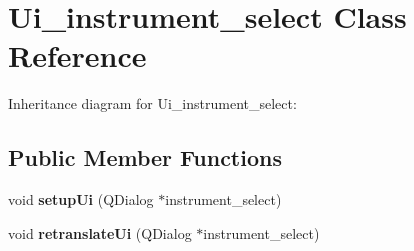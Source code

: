 \hypertarget{classUi__instrument__select}{}\section{Ui\+\_\+instrument\+\_\+select Class Reference}
\label{classUi__instrument__select}


Inheritance diagram for Ui\+\_\+instrument\+\_\+select\+:
\subsection*{Public Member Functions}
\begin{DoxyCompactItemize}
\item 
\mbox{\label{classUi__instrument__select_ad0030e4de3be2fb722423e6d8f8a21cc}} 
void {\bfseries setup\+Ui} (Q\+Dialog $\ast$instrument\+\_\+select)
\item 
\mbox{\label{classUi__instrument__select_a5dc451a325ae87b4b32ea93a55a4fecf}} 
void {\bfseries retranslate\+Ui} (Q\+Dialog $\ast$instrument\+\_\+select)
\end{DoxyCompactItemize}
